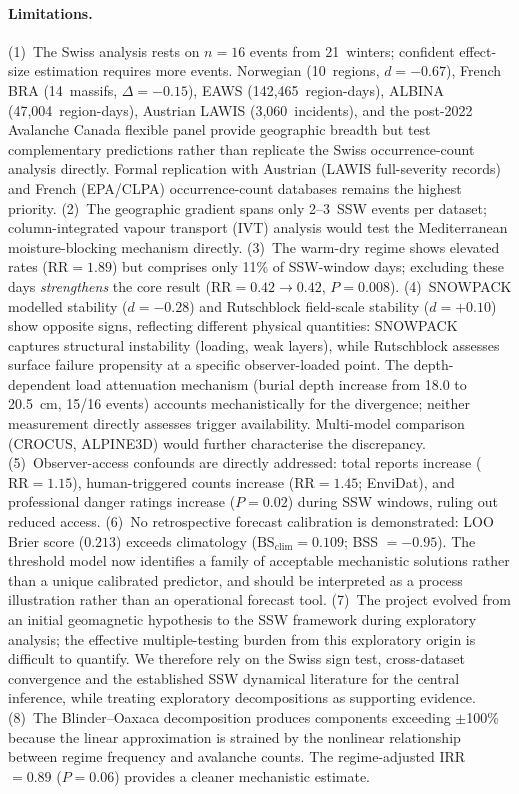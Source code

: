 \documentclass[11pt,letterpaper]{article}
\begin{document}
\paragraph{Limitations.} (1)~The Swiss analysis rests on $n = 16$ events from 21~winters; confident effect-size estimation requires more events. Norwegian (10~regions, $d = -0.67$), French BRA (14~massifs, $\Delta = -0.15$), EAWS (142,465~region-days), ALBINA (47,004~region-days), Austrian LAWIS (3,060~incidents), and the post-2022 Avalanche Canada flexible panel provide geographic breadth but test complementary predictions rather than replicate the Swiss occurrence-count analysis directly. Formal replication with Austrian (LAWIS full-severity records) and French (EPA/CLPA) occurrence-count databases remains the highest priority. (2)~The geographic gradient spans only 2--3~SSW events per dataset; column-integrated vapour transport (IVT) analysis would test the Mediterranean moisture-blocking mechanism directly. (3)~The warm-dry regime shows elevated rates ($\mathrm{RR} = 1.89$) but comprises only 11\% of SSW-window days; excluding these days \emph{strengthens} the core result ($\mathrm{RR} = 0.42 \to 0.42$, $P = 0.008$). (4)~SNOWPACK modelled stability ($d = -0.28$) and Rutschblock field-scale stability ($d = +0.10$) show opposite signs, reflecting different physical quantities: SNOWPACK captures structural instability (loading, weak layers), while Rutschblock assesses surface failure propensity at a specific observer-loaded point. The depth-dependent load attenuation mechanism (burial depth increase from 18.0 to 20.5~cm, 15/16 events) accounts mechanistically for the divergence; neither measurement directly assesses trigger availability. Multi-model comparison (CROCUS, ALPINE3D) would further characterise the discrepancy. (5)~Observer-access confounds are directly addressed: total reports increase ($\mathrm{RR} = 1.15$), human-triggered counts increase ($\mathrm{RR} = 1.45$; EnviDat), and professional danger ratings increase ($P = 0.02$) during SSW windows, ruling out reduced access. (6)~No retrospective forecast calibration is demonstrated: LOO Brier score ($0.213$) exceeds climatology ($\mathrm{BS}_{\mathrm{clim}} = 0.109$; BSS $= -0.95$). The threshold model now identifies a family of acceptable mechanistic solutions rather than a unique calibrated predictor, and should be interpreted as a process illustration rather than an operational forecast tool. (7)~The project evolved from an initial geomagnetic hypothesis to the SSW framework during exploratory analysis; the effective multiple-testing burden from this exploratory origin is difficult to quantify. We therefore rely on the Swiss sign test, cross-dataset convergence and the established SSW dynamical literature for the central inference, while treating exploratory decompositions as supporting evidence. (8)~The Blinder--Oaxaca decomposition produces components exceeding $\pm$100\% because the linear approximation is strained by the nonlinear relationship between regime frequency and avalanche counts\cite{Bauer2008}. The regime-adjusted IRR $= 0.89$ ($P = 0.06$) provides a cleaner mechanistic estimate.
\end{document}
